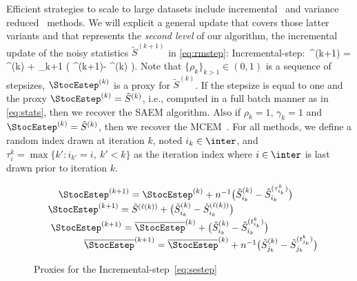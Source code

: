 \documentclass[11pt]{article}
\makeatletter
\newcounter{protocol}
\newenvironment{protocol}[1][htb]{%
  \let\c@algorithm\c@protocol
  \renewcommand{\ALG@name}{Protocol}%
  \begin{algorithm}[#1]%
  }{\end{algorithm}
}
\theoremstyle{t}
\makeatother
\begin{document}
Efficient strategies to scale to large datasets include incremental~\citep{neal1998view} and variance reduced~\citep{chen2018stochastic, johnson:zhang:2013} methods.
We will explicit a general update that covers those latter variants and that represents the \textit{second level} of our algorithm, \ie the incremental update of the noisy statistics $\tilde{S}^{(k+1)}$ in \eqref{eq:rmstep}:
\beq \label{eq:sestep}
\textsf{Incremental-step}:~^{(k+1)} = ^{(k)} + \rho_{k+1} \big( \StocEstep^{(k+1)}- ^{(k)}  \big)\eqs.
\eeq
Note that $\{ \rho_{k} \}_{k>1} \in (0,1)$ is a sequence of stepsizes, $\StocEstep^{(k)}$ is a proxy for $\tilde{S}^{(k)}$.
If the stepsize is equal to one and the proxy $\StocEstep^{(k)} = \tilde{S}^{(k)}$, i.e., computed in a full batch manner as in \eqref{eq:stats}, then we recover the SAEM algorithm.
Also if $\rho_{k}=1$, $\gamma_{k}=1$ and $\StocEstep^{(k)} = \tilde{S}^{(k)}$, then we recover the MCEM~\citep{wei1990monte}.
For all methods, we define a random index drawn at iteration $k$, noted $i_k \in \inter$, and $\tau_i^k = \max \{ k' : i_{k'} = i,~k' < k \}$ as the iteration index where $i \in \inter$ is last drawn prior to iteration $k$.
 \begin{figure}\vspace{-0.25in}
 \begin{minipage}{\linewidth}
 \begin{protocol}[H]
\caption{Proxies for the Incremental-step~\eqref{eq:sestep}}\label{alg:prox}
  \begin{algorithmic}[1]
  \STATE \textsf{\ISAEM\ }$\hspace{0.7cm} \StocEstep^{(k+1)} = \StocEstep^{(k)} + n^{-1} \big( \tilde{S}_{i_k}^{(k)}  - \tilde{S}_{i_k}^{(\tau_{i_k}^k)} \big) \label{eq:isaem}$
    \STATE \textsf{\SAEMVR\ }$\hspace{0.5cm} \StocEstep^{(k+1)}  = \tilde{S}^{(\ell(k))} +  \big( \tilde{S}_{i_k}^{(k)}  -\tilde{S}_{i_k}^{(\ell(k))}   \big) \label{eq:vrsaem}$
      \STATE \textsf{\FISAEM\ }$\hspace{0.6cm} \StocEstep^{(k+1)} =\overline{\StocEstep}^{(k)} + \big( \tilde{S}_{i_k}^{(k)}  - \tilde{S}_{i_k}^{(t_{i_k}^k)} \big) \label{eq:fisaem}$\\
             $ \hspace{1.8cm} \overline{\StocEstep}^{(k+1)} = \overline{\StocEstep}^{(k)} + n^{-1} \big( \tilde{S}_{j_k}^{(k)}  - \tilde{S}_{j_k}^{(t_{j_k}^k)} \big)$
  \end{algorithmic}
\end{protocol}
 \end{minipage}
 \end{figure}
\end{document}

